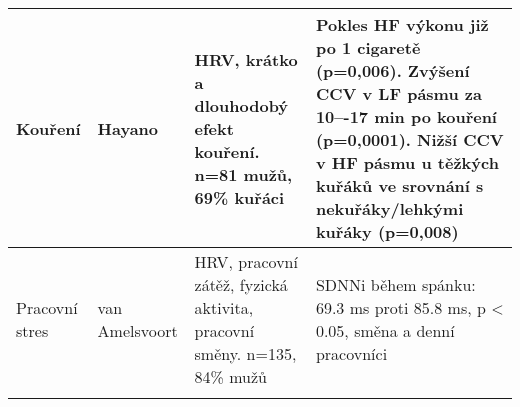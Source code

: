 \begin{table}[h]
\begin{center}
\begin{tabular}{|p{1.3cm}|p{1.7cm}|p{4.5cm}|p{5.5cm}|}
			Kouření         & Hayano             & HRV, krátko a dlouhodobý efekt kouření. n=81 mužů, 69\% kuřáci          & Pokles HF výkonu již po 1 cigaretě (p=0,006). Zvýšení CCV v LF pásmu za 10–-17 min po kouření (p=0,0001). Nižší CCV v HF pásmu u těžkých kuřáků ve srovnání s nekuřáky/lehkými kuřáky (p=0,008) \\ \hline
			Pracovní stres  & van Amelsvoort     & HRV, pracovní zátěž, fyzická aktivita, pracovní směny. n=135, 84\% mužů & SDNNi během spánku: 69.3 ms proti 85.8 ms, p < 0.05, směna a denní pracovníci                                                                                                                   \\ \noalign{\hrule height 2pt}
		\end{tabular}
	\end{center}
\end{table}